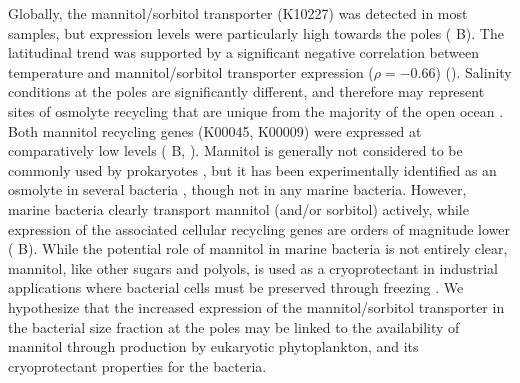 \documentclass[utf8]{frontiersSCNS} %
\begin{document}
Globally, the mannitol/sorbitol transporter (K10227) was detected in most samples, but expression levels were particularly high towards the poles ( B). The latitudinal trend was supported by a significant negative correlation between temperature and mannitol/sorbitol transporter expression ($\rho=-0.66$) (). Salinity conditions at the poles are significantly different, and therefore may represent sites of osmolyte recycling that are unique from the majority of the open ocean \citep{Bano2004}. Both mannitol recycling genes (K00045, K00009) were expressed at comparatively low levels ( B, ). Mannitol is generally not considered to be commonly used by prokaryotes \citep{Empadinhas2008}, but it has been experimentally identified as an osmolyte in several bacteria \citep{Kets1996,Zahid2015}, though not in any marine bacteria. However, marine bacteria clearly transport mannitol (and/or sorbitol) actively, while expression of the associated cellular recycling genes are orders of magnitude lower ( B). While the potential role of mannitol in marine bacteria is not entirely clear, mannitol, like other sugars and polyols, is used as a cryoprotectant in industrial applications where bacterial cells must be preserved through freezing \citep{Savini2010}. We hypothesize that the increased expression of the mannitol/sorbitol transporter in the bacterial size fraction at the poles may be linked to the availability of mannitol through production by eukaryotic phytoplankton, and its cryoprotectant properties for the bacteria. 
\end{document}
